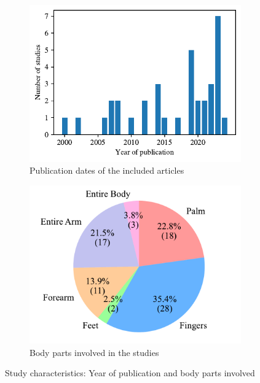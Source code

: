 \begin{figure}[htbp]
    \centering
    \begin{subfigure}[b]{0.24\textwidth}
        \centering
        \includegraphics[width=\textwidth]{figures/years.pdf}
        \caption{Publication dates of the included articles}
        \label{fig:years}
    \end{subfigure}
    \hfill
    \begin{subfigure}[b]{0.24\textwidth}
        \centering
        \includegraphics[width=\textwidth]{figures/body_pie.pdf}
        \caption{Body parts involved in the studies}
        \label{fig:body_parts_pie}
    \end{subfigure}
    \caption{Study characteristics: Year of publication and body parts involved}
    \label{fig:years_and_body}
\end{figure}

